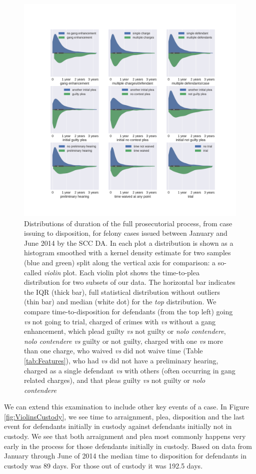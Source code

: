 \documentclass{AISB2008}
\begin{document}
\begin{figure}[h!]
\begin{center}
\includegraphics[width=0.70\columnwidth]{figures/multiple_violins4/multiple_violins4}
\caption{Distributions of duration of the full prosecutorial process, from case issuing to disposition, for felony cases issued between January and June 2014 by the SCC DA.  In each plot a distribution is shown as a histogram smoothed with a kernel density estimate for two samples (blue and green) split along the vertical axis for comparison: a so-called {\it violin} plot. Each violin plot shows the time-to-plea distribution for two subsets of our data. The horizontal bar indicates the IQR (thick bar), full statistical distribution without outliers (thin bar) and median (white dot) for the {\it top} distribution. We compare time-to-disposition for defendants (from the top left) going {\it vs} not going to trial, charged of crimes with {\it vs} without a gang enhancement, which plead guilty {\it vs} not guilty or {\it nolo contendere}, {\it nolo contendere} {\it vs} guilty or not guilty, charged with one {\it vs} more than one charge, who waived {\it vs} did not waive time (Table \ref{tab:Features}), who had {\it vs} did not have a preliminary hearing, charged as a single defendant {\it vs} with others (often occurring in gang related charges), and that pleas guilty {\it vs} not guilty or {\it nolo contendere}
\label{fig:Violins}%
}
\end{center}
\end{figure}

We can extend this examination to include other key events of a case. In Figure \ref{fig:ViolinsCustody}, we see time to arraignment, plea, disposition and the last event for defendants initially in custody against defendants initially not in custody. We see that both arraignment and plea most commonly happens very early in the process for those defendants initially in custody. Based on data from January through June of 2014 the median time to disposition for defendants in custody was 89 days. For those out of custody it was 192.5 days.
\end{document}
